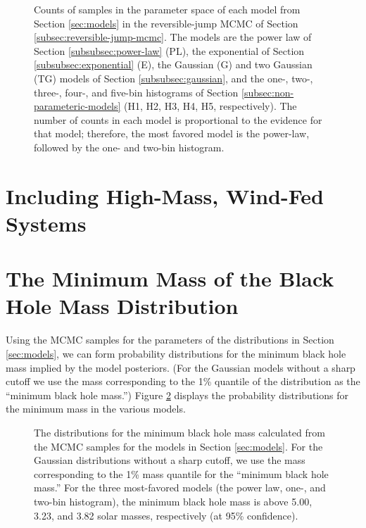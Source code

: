\documentclass[preprint]{aastex}
\begin{document}
\begin{figure}
  \begin{center}
  \end{center}
  \caption{\label{fig:rj} Counts of samples in the parameter space of
    each model from Section \ref{sec:models} in the reversible-jump
    MCMC of Section \ref{subsec:reversible-jump-mcmc}.  The models
    are the power law of Section \ref{subsubsec:power-law} (PL),
    the exponential of Section \ref{subsubsec:exponential} (E),
    the Gaussian (G) and two Gaussian (TG) models of Section
    \ref{subsubsec:gaussian}, and the one-, two-, three-, four-, and
    five-bin histograms of Section
    \ref{subsec:non-parameteric-models} (H1, H2, H3, H4, H5,
    respectively).  The number of counts in each model is proportional
    to the evidence for that model; therefore, the most favored model
    is the power-law, followed by the one- and two-bin histogram.  }
\end{figure}

\section{Including High-Mass, Wind-Fed Systems}
\label{sec:higher-mass}

\section{The Minimum Mass of the Black Hole Mass Distribution}
\label{sec:minimum-mass}

Using the MCMC samples for the parameters of the distributions in
Section \ref{sec:models}, we can form probability distributions for
the minimum black hole mass implied by the model posteriors.  (For the
Gaussian models without a sharp cutoff we use the mass corresponding
to the 1\% quantile of the distribution as the ``minimum black hole
mass.'')  Figure \ref{fig:min-mass} displays the probability
distributions for the minimum mass in the various models.  

\begin{figure}
  \begin{center}
  \end{center}
  \caption{\label{fig:min-mass} The distributions for the minimum
    black hole mass calculated from the MCMC samples for the models in
    Section \ref{sec:models}.  For the Gaussian distributions without
    a sharp cutoff, we use the mass corresponding to the 1\% mass
    quantile for the ``minimum black hole mass.''  For the three
    most-favored models (the power law, one-, and two-bin histogram),
    the minimum black hole mass is above 5.00, 3.23, and 3.82 solar
    masses, respectively (at 95\% confidence). }
\end{figure}
\end{document}
